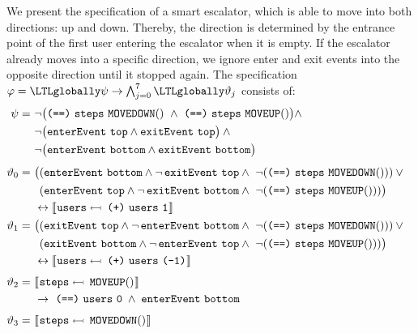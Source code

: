 We present the specification of a smart escalator, which is able to
move into both directions: up and down. Thereby, the direction is
determined by the entrance point of the first user entering the
escalator when it is empty. If the escalator already moves into a
specific direction, we ignore enter and exit events into the opposite
direction until it stopped again. The specification
$ \varphi = \LTLglobally \psi \rightarrow \bigwedge_{j=0}^{7}
\LTLglobally \vartheta_{j} $ consists of:
%
\begin{align*}
  \psi = \ & \neg \big(\name{(==)}~\name{steps}~\name{MOVEDOWN}() \ \wedge \ \name{(==)}~\name{steps}~\name{MOVEUP}()\big) \wedge \\
           & \neg \big(\name{enterEvent}~\name{top} \wedge  \name{exitEvent}~\name{top} \big) \wedge \mbox{\,}\\
           & \neg \big(\name{enterEvent}~\name{bottom} \wedge  \name{exitEvent}~\name{bottom} \big) \\[0.4em]
  \vartheta_{0} =\ & \big( (\name{enterEvent}~\name{bottom} \wedge \neg \, \name{exitEvent}~\name{top} \wedge \mbox{\ }
                     \neg (\name{(==)}~\name{steps}~\name{MOVEDOWN}()) ) \vee \mbox{ \ }\\
                   & \phantom{\big(} (\name{enterEvent}~\name{top} \wedge \neg \, \name{exitEvent}~\name{bottom} \wedge \mbox{\ }
                     \neg (\name{(==)}~\name{steps}~\name{MOVEUP}())) \big) \\
                   & \leftrightarrow \upd{\name{users}}{\name{(+)}~\name{users}~\name{1}}  \\
  \vartheta_{1} =\ & \big((\name{exitEvent}~\name{top} \wedge \neg \, \name{enterEvent}~\name{bottom} \wedge \mbox{\ }
                     \neg (\name{(==)}~\name{steps}~\name{MOVEDOWN}())) \vee \mbox{\ } \\
                   & \phantom{\big(}(\name{exitEvent}~\name{bottom} \wedge \neg \, \name{enterEvent}~\name{top} \wedge \mbox{\ }
                     \neg (\name{(==)}~\name{steps}~\name{MOVEUP}()))\big) \\
                   & \leftrightarrow \upd{\name{users}}{\name{(+)}~\name{users}~\name{(-1)}}  \\[0.4em]
  \vartheta_{2} =\ & \upd{\name{steps}}{\name{MOVEUP}()} \\
                   & \rightarrow \ \name{(==)}~\name{users}~\name{0} \; \wedge \; \name{enterEvent}~\name{bottom} \\[0.4em]
  \vartheta_{3} =\ & \upd{\name{steps}}{\name{MOVEDOWN}()} \\

\end{align*}
